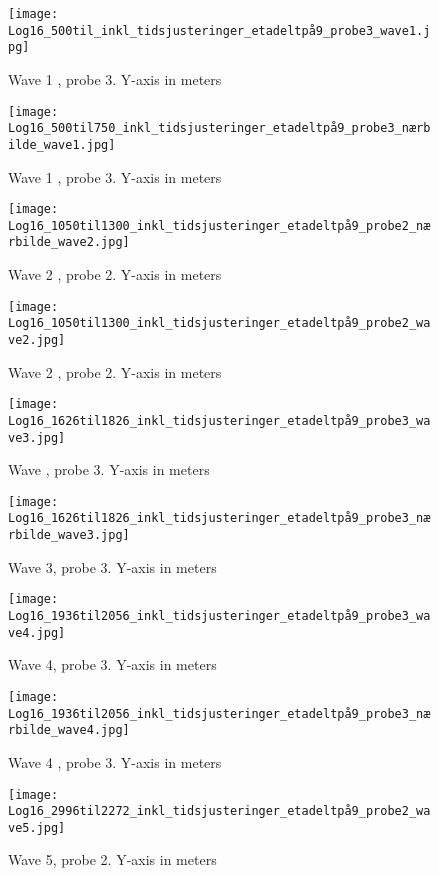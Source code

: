 \begin{figure}[ht]
    \centering
    \texttt{[image: Log16\_500til\_inkl\_tidsjusteringer\_etadeltpå9\_probe3\_wave1.jpg]}
    \caption{Wave 1 , probe 3. Y-axis in meters}
    \label{fig:}
\end{figure}
\begin{figure}[ht]
    \centering
    \texttt{[image: Log16\_500til750\_inkl\_tidsjusteringer\_etadeltpå9\_probe3\_nærbilde\_wave1.jpg]}
    \caption{Wave 1 , probe 3. Y-axis in meters}
    \label{fig:}
\end{figure}
\begin{figure}[ht]
    \centering
    \texttt{[image: Log16\_1050til1300\_inkl\_tidsjusteringer\_etadeltpå9\_probe2\_nærbilde\_wave2.jpg]}
    \caption{Wave 2 , probe 2. Y-axis in meters}
    \label{fig:}
\end{figure}
\begin{figure}[ht]
    \centering
    \texttt{[image: Log16\_1050til1300\_inkl\_tidsjusteringer\_etadeltpå9\_probe2\_wave2.jpg]}
    \caption{Wave 2 , probe 2. Y-axis in meters}
    \label{fig:}
\end{figure}
\begin{figure}[ht]
    \centering
    \texttt{[image: Log16\_1626til1826\_inkl\_tidsjusteringer\_etadeltpå9\_probe3\_wave3.jpg]}
    \caption{Wave , probe 3. Y-axis in meters}
    \label{fig:}
\end{figure}
\begin{figure}[ht]
    \centering
    \texttt{[image: Log16\_1626til1826\_inkl\_tidsjusteringer\_etadeltpå9\_probe3\_nærbilde\_wave3.jpg]}
    \caption{Wave 3, probe 3. Y-axis in meters}
    \label{fig:}
\end{figure}
\begin{figure}[ht]
    \centering
    \texttt{[image: Log16\_1936til2056\_inkl\_tidsjusteringer\_etadeltpå9\_probe3\_wave4.jpg]}
    \caption{Wave 4, probe 3. Y-axis in meters}
    \label{fig:}
\end{figure}
\begin{figure}[ht]
    \centering
    \texttt{[image: Log16\_1936til2056\_inkl\_tidsjusteringer\_etadeltpå9\_probe3\_nærbilde\_wave4.jpg]}
    \caption{Wave 4 , probe 3. Y-axis in meters}
    \label{fig:}
\end{figure}
\begin{figure}[ht]
    \centering
    \texttt{[image: Log16\_2996til2272\_inkl\_tidsjusteringer\_etadeltpå9\_probe2\_wave5.jpg]}
    \caption{Wave 5, probe 2. Y-axis in meters}
    \label{fig:}
\end{figure}
